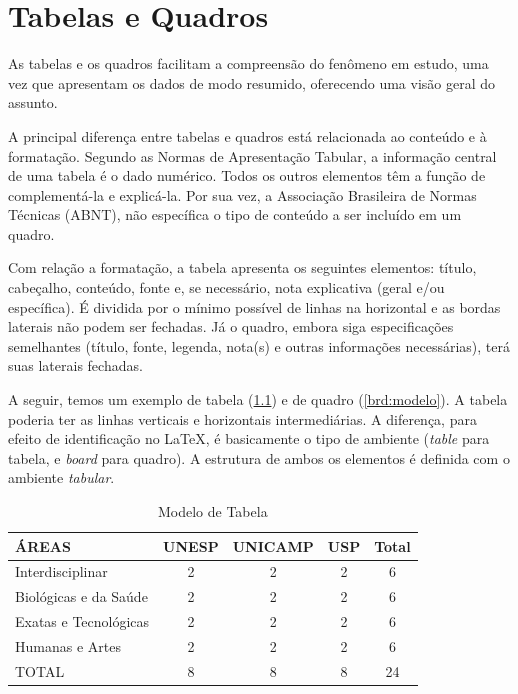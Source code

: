 \chapter{Tabelas e Quadros}\label{chp:tabquad}

    As tabelas e os quadros facilitam a compreensão do fenômeno em estudo, uma vez que apresentam os dados de modo resumido, oferecendo uma visão geral do assunto.

    A principal diferença entre tabelas e quadros está relacionada ao conteúdo e à formatação. Segundo as Normas de Apresentação Tabular, a informação central de uma tabela é o dado numérico. Todos os outros elementos têm a função de complementá-la e explicá-la. Por sua vez, a Associação Brasileira de Normas Técnicas (ABNT), não específica o tipo de conteúdo a ser incluído em um quadro.

    Com relação a formatação, a tabela apresenta os seguintes elementos: título, cabeçalho, conteúdo, fonte e, se necessário, nota explicativa (geral e/ou específica). É dividida por o mínimo possível de linhas na horizontal e as bordas  laterais não podem ser fechadas. Já o quadro, embora siga especificações semelhantes  (título, fonte, legenda, nota(s) e outras informações necessárias), terá suas laterais fechadas.

    A seguir, temos um exemplo de tabela (\cref{tab:modelo}) e de quadro (\cref{brd:modelo}). A tabela poderia ter as linhas verticais e horizontais intermediárias. A diferença, para efeito de identificação no \LaTeX, é basicamente o tipo de ambiente (\emph{table} para tabela, e \emph{board} para quadro). A estrutura de ambos os elementos é definida com o ambiente \emph{tabular}.

    \begin{table}[!htb]
        \small
        \centering
        \caption{Modelo de Tabela}
        \label{tab:modelo}
        \begin{tabular}{lcccc}                                       \hline
            ÁREAS                 & UNESP & UNICAMP & USP & Total \\ \hline
            Interdisciplinar      &  2    &  2      & 2   &  6    \\ 
            Biológicas e da Saúde &  2    &  2      & 2   &  6    \\ 
            Exatas e Tecnológicas &  2    &  2      & 2   &  6    \\ 
            Humanas e Artes       &  2    &  2      & 2   &  6    \\ \hline
            TOTAL                 &  8    &  8      & 8   & 24    \\ \hline
        \end{tabular}
        \vspace{0.2cm}
    \end{table}

